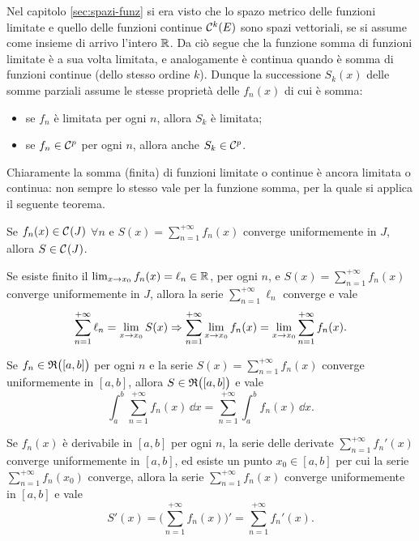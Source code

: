 Nel capitolo \ref{sec:spazi-funz} si era visto che lo spazo metrico delle funzioni limitate e quello delle funzioni continue $\mathcal{C}^{{k}}(E)$ sono spazi vettoriali, se si assume come insieme di arrivo l'intero $\mathbb{R}$. Da ciò segue che la funzione somma di funzioni limitate è a sua volta limitata, e analogamente è continua quando è somma di funzioni continue (dello stesso ordine $k$). Dunque la successione $S_k(x)$ delle somme parziali assume le stesse proprietà delle $f_n(x)$ di cui è somma:
\begin{itemize}
\item se $f_n$ è limitata per ogni $n$, allora $S_k$ è limitata;
\item se $f_n\in\mathcal{C}^{{p}}$ per ogni $n$, allora anche $S_k\in\mathcal{C}^{{p}}$.
\end{itemize}
Chiaramente la somma (finita) di funzioni limitate o continue è ancora limitata o continua: non sempre lo stesso vale per la funzione somma, per la quale si applica il seguente teorema.
\begin{teorema}
	Se $f_n(x)\in\mathcal{C}^{{}}(J)$ $\forall n$ e $S(x)=\sum_{n=1}^{+\infty}f_n(x)$ converge uniformemente in $J$, allora $S\in\mathcal{C}^{{}}(J)$.
\end{teorema}
\begin{teorema} \label{t:continuita_serie_conv_uniforme}
Se esiste finito il $\lim_{x\to x_0}f_n(x)=\ell_n\in\mathbb{R}$, per ogni $n$, e $S(x)=\sum_{n=1}^{+\infty}f_n(x)$ converge uniformemente in $J$, allora la serie $\sum_{n=1}^{+\infty}\ell_n$ converge e vale
\[
\sum_{n=1}^{+\infty}\ell_n=\lim_{x\to x_0}S(x)\Rightarrow\sum_{n=1}^{+\infty}\lim_{x\to x_0}f_n(x)=\lim_{x\to x_0}\sum_{n=1}^{+\infty}f_n(x).
\]
\end{teorema}
\begin{teorema} \label{t:scambio_integrale_serie}
Se $f_n\in\mathfrak{R}\big([a,b]\big)$ per ogni $n$ e la serie $S(x)=\sum_{n=1}^{+\infty}f_n(x)$ converge uniformemente in $[a,b]$, allora $S\in\mathfrak{R}\big([a,b]\big)$ e vale
\[
\int_a^b\sum_{n=1}^{+\infty}f_n(x)\,\dd x=\sum_{n=1}^{+\infty}\int_a^bf_n(x)\,\dd x.
\]
\end{teorema}
\begin{teorema} \label{t:scambio_derivata_serie}
Se $f_n(x)$ è derivabile in $[a,b]$ per ogni $n$, la serie delle derivate $\sum_{n=1}^{+\infty}f_n'(x)$ converge uniformemente in $[a,b]$, ed esiste un punto $x_0\in[a,b]$ per cui la serie $\sum_{n=1}^{+\infty}f_n(x_0)$ converge, allora la serie $\sum_{n=1}^{+\infty}f_n(x)$ converge uniformemente in $[a,b]$ e vale
\[
S'(x)=\bigg(\sum_{n=1}^{+\infty}f_n(x)\bigg)'=\sum_{n=1}^{+\infty}f_n'(x).
\]
\end{teorema}

